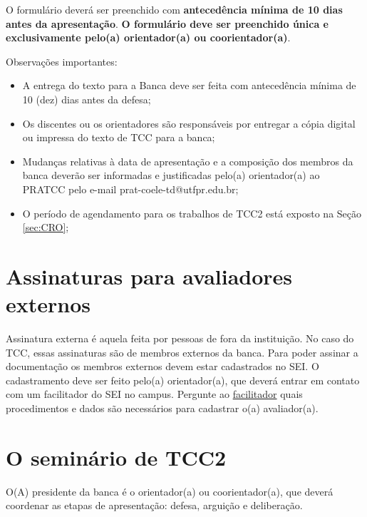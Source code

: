 \documentclass[a4paper, 12pt]{article}
\begin{document}
    O formulário deverá ser preenchido com \textbf{antecedência mínima de 10 dias antes da apresentação}. \textbf{O formulário deve ser preenchido única e exclusivamente pelo(a) orientador(a) ou coorientador(a)}.    
		
    Observações importantes:
    
    \begin{itemize}
    	\item A entrega do texto para a Banca deve ser feita com antecedência mínima de 10 (dez) dias antes da defesa;
    	\item Os discentes ou os orientadores são responsáveis por entregar a cópia digital ou impressa do texto de TCC para a banca;
    	\item Mudanças relativas à data de apresentação e a composição dos membros da banca deverão ser informadas e justificadas pelo(a) orientador(a) ao PRATCC pelo e-mail prat-coele-td@utfpr.edu.br;
    	\item O período de agendamento para os trabalhos de TCC2 está exposto na Seção \ref{sec:CRO};
    \end{itemize}

	\section{Assinaturas para avaliadores externos}
	
	Assinatura externa é aquela feita por pessoas de fora da instituição. No caso do TCC, essas assinaturas são de membros externos da banca. Para poder assinar a documentação os membros externos devem estar cadastrados no SEI. O cadastramento deve ser feito pelo(a) orientador(a), que deverá entrar em contato com um facilitador do SEI no campus. Pergunte ao \href{http://portal.utfpr.edu.br/servidores/servicos-servidor/sei/facilitadores}{facilitador} quais procedimentos e dados são necessários para cadastrar o(a) avaliador(a).

	\section{O seminário de TCC2}
	
	O(A) presidente da banca é o orientador(a) ou coorientador(a), que deverá coordenar as etapas de apresentação: defesa, arguição e deliberação. 
	
\end{document}
